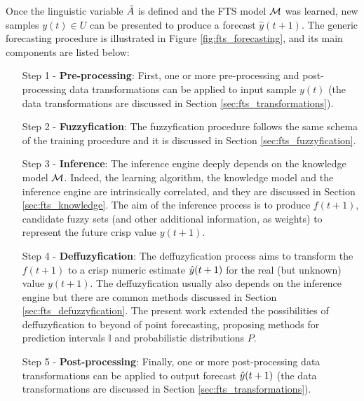 Once the linguistic variable $\tilde{A}$ is defined and the FTS model $\mathcal{M}$ was learned, new samples $y(t) \in U$ can be presented to produce a forecast $\hat{y}(t+1)$. The generic forecasting procedure is illustrated in Figure \ref{fig:fts_forecasting}, and its main components are listed below:

\begin{enumerate}
    \item [Step 1] - \textbf{Pre-processing}: First, one or more pre-processing and post-processing data transformations can be applied to input sample $y(t)$ (the data transformations are discussed in Section \ref{sec:fts_transformations}).
    
    \item[Step 2] - \textbf{Fuzzyfication}: The fuzzyfication procedure follows the same schema of the training procedure and it is discussed in Section \ref{sec:fts_fuzzyfication}. 
    
    \item[Step 3] - \textbf{Inference}: The inference engine deeply depends on the knowledge model $\mathcal{M}$. Indeed, the learning algorithm, the knowledge model and the inference engine are intrinsically correlated, and they are discussed in Section \ref{sec:fts_knowledge}. The aim of the inference process is to produce $f(t+1)$, candidate fuzzy sets (and other additional information, as weights) to represent the future crisp value $y(t+1)$.
    
    \item[Step 4] - \textbf{Deffuzyfication}: The deffuzyfication process aims to transform the $f(t+1)$ to a crisp numeric estimate $\hat{y}(t+1)$ for the real (but unknown) value $y(t+1)$. The deffuzyfication usually also depends on the inference engine but there are common methods discussed in Section \ref{sec:fts_defuzzyfication}. The present work extended the possibilities of deffuzyfication to beyond of point forecasting, proposing methods for prediction intervals $\mathbb{I}$ and probabilistic distributions $P$.
    
    \item [Step 5] - \textbf{Post-processing}: Finally, one or more post-processing data transformations can be applied to output forecast $\hat{y}(t+1)$  (the data transformations are discussed in Section \ref{sec:fts_transformations}).
\end{enumerate}

